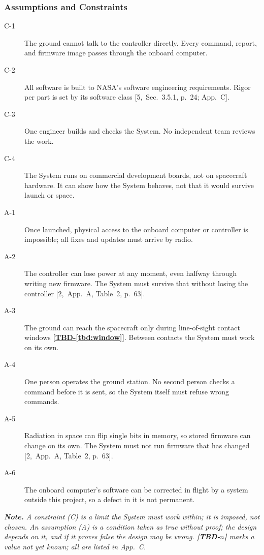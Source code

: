 \documentclass[11pt,a4paper]{article}
\newcommand{\tbd}[1]{\mbox{\textbf{[\hyperref[tbd:#1]{TBD-\ref*{tbd:#1}}]}}}
\begin{document}
\subsubsection{Assumptions and Constraints}
\begin{description}
\item[C-1] The ground cannot talk to the controller directly. Every command,
  report, and firmware image passes through the onboard computer.
\item[C-2] All software is built to NASA's software engineering requirements.
  Rigor per part is set by its software class [5,~Sec.~3.5.1, p.~24; App.~C].
\item[C-3] One engineer builds and checks the System. No independent team
  reviews the work.
\item[C-4] The System runs on commercial development boards, not on spacecraft
  hardware. It can show how the System behaves, not that it would survive
  launch or space.
\item[A-1] Once launched, physical access to the onboard computer or controller
  is impossible; all fixes and updates must arrive by radio.
\item[A-2] The controller can lose power at any moment, even halfway through
  writing new firmware. The System must survive that without losing the
  controller [2,~App.~A, Table~2, p.~63].
\item[A-3] The ground can reach the spacecraft only during line-of-sight
  contact windows \tbd{window}. Between contacts the System must work on its
  own.
\item[A-4] One person operates the ground station. No second person checks a
  command before it is sent, so the System itself must refuse wrong commands.
\item[A-5] Radiation in space can flip single bits in memory, so stored
  firmware can change on its own. The System must not run firmware that has
  changed [2,~App.~A, Table~2, p.~63].
\item[A-6] The onboard computer's software can be corrected in flight by a
  system outside this project, so a defect in it is not permanent.
\end{description}

\medskip
{\itshape \noindent\textbf{Note.} A constraint (C) is a limit the System must work
within; it is imposed, not chosen. An assumption (A) is a condition taken as
true without proof; the design depends on it, and if it proves false the design
may be wrong. \textbf{[TBD-$n$]} marks a value not yet known; all are listed
in App.~C.\par}
\end{document}
